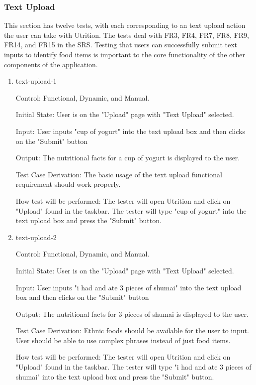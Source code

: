 \documentclass[12pt, titlepage]{article}
\begin{document}
	\subsubsection{Text Upload}
	This section has twelve tests, with each corresponding to an text upload action the user can take with Utrition. The tests deal with FR3, FR4, FR7, FR8, FR9, FR14, and FR15 in the SRS. Testing that users can successfully submit text inputs to identify food items is 
	important to the core functionality of the other components of the 
	application.
	
	\begin{enumerate}
	\item{text-upload-1\\}
	
	Control: Functional, Dynamic, and Manual.
	
	Initial State: User is on the "Upload" page with "Text Upload" selected.
	
	Input: User inputs "cup of yogurt" into the text upload box and then clicks on the "Submit" button
	
	Output: The nutritional facts for a cup of yogurt is displayed to the user.
	
	Test Case Derivation: The basic usage of the text upload functional requirement should work properly.
	
	How test will be performed: The tester will open Utrition and click on "Upload" found in the taskbar. The tester will type "cup of yogurt" into the text upload box and press the "Submit" button.
	
	\item{text-upload-2\\}
	
	Control: Functional, Dynamic, and Manual.
	
	Initial State: User is on the "Upload" page with "Text Upload" selected.
	
	Input: User inputs "i had and ate 3 pieces of shumai" into the text upload box and then clicks on the "Submit" button
	
	Output: The nutritional facts for 3 pieces of shumai is displayed to the user.
	
	Test Case Derivation: Ethnic foods should be available for the user to input. User should be able to use complex phrases instead of just food items.
	
	How test will be performed: The tester will open Utrition and click on "Upload" found in the taskbar. The tester will type "i had and ate 3 pieces of shumai" into the text upload box and press the "Submit" button.
	

\end{enumerate}
\end{document}
